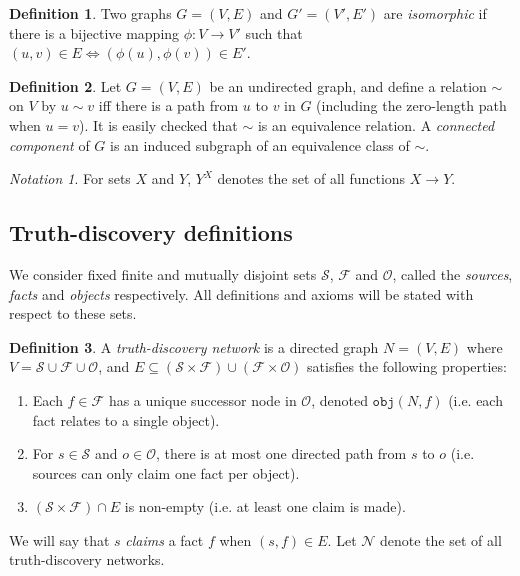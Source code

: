\documentclass{article}
\theoremstyle{definition} \newtheorem{definition}{Definition}
\theoremstyle{definition} \newtheorem{example}{Example}
\theoremstyle{plain} \newtheorem{axiom}{Axiom}
\theoremstyle{plain} \newtheorem*{remark}{Remark}
\theoremstyle{remark} \newtheorem*{notation}{Notation}
\theoremstyle{plain} \newtheorem{lemma}{Lemma}
\theoremstyle{plain} \newtheorem{theorem}{Theorem}
\theoremstyle{plain} \newtheorem{proposition}{Proposition}
\renewcommand{\S}{\mathcal{S}}  %
\renewcommand{\O}{\mathcal{O}}  %
\newcommand{\F}{\mathcal{F}}
\newcommand{\N}{\mathcal{N}}
\newcommand{\obj}{\texttt{obj}}
\begin{document}
\begin{definition}

Two graphs $G=(V, E)$ and $G'=(V', E')$ are \emph{isomorphic} if there is a
bijective mapping $\phi: V \rightarrow V'$ such that $(u, v) \in E \iff
(\phi(u), \phi(v)) \in E'$.

\end{definition}

\begin{definition}
Let $G=(V, E)$ be an undirected graph, and define a relation $\sim$ on $V$ by
$u \sim v$ iff there is a path from $u$ to $v$ in $G$ (including the
zero-length path when $u = v$). It is easily checked that $\sim$ is an
equivalence relation. A \emph{connected component} of $G$ is an induced
subgraph of an equivalence class of $\sim$.
\end{definition}

\begin{notation}
For sets $X$ and $Y$, $Y^X$ denotes the set of all functions $X \rightarrow Y$.
\end{notation}

\subsection{Truth-discovery definitions}

We consider fixed finite and mutually disjoint sets $\S$, $\F$ and $\O$, called
the \emph{sources}, \emph{facts} and \emph{objects} respectively. All
definitions and axioms will be stated with respect to these sets.

\begin{definition}

A \emph{truth-discovery network} is a directed graph $N = (V, E)$ where $V = \S
\cup \F \cup \O$, and $E \subseteq (\S \times \F) \cup (\F \times \O)$
satisfies the following properties:

\begin{enumerate}
\item Each $f \in \F$ has a unique successor node in $\O$, denoted $\obj(N, f)$
(i.e. each fact relates to a single object).

\item For $s \in \S$ and $o \in \O$, there is at most one directed path from
$s$ to $o$ (i.e. sources can only claim one fact per object).

\item $(\S \times \F) \cap E$ is non-empty (i.e. at least one claim is made).

\end{enumerate}
We will say that $s$ \emph{claims} a fact $f$ when $(s, f) \in E$. Let $\N$
denote the set of all truth-discovery networks.
\end{definition}
\end{document}
